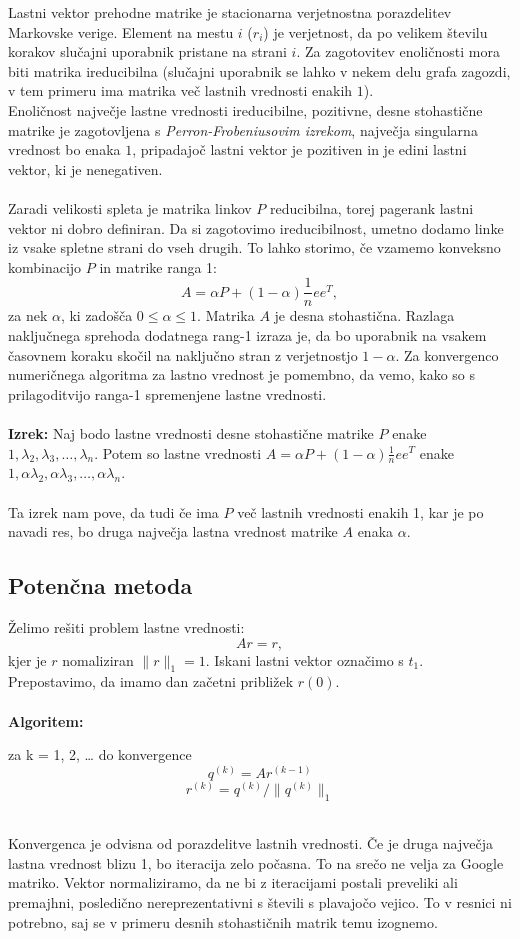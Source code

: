 \documentclass[12pt,a4paper]{amsart}
\begin{document}
Lastni vektor prehodne matrike je stacionarna verjetnostna porazdelitev Markovske verige. Element na mestu $i$ ($r_i$) je verjetnost, da po velikem številu korakov slučajni uporabnik pristane na strani $i$. Za zagotovitev enoličnosti mora biti matrika ireducibilna (slučajni uporabnik se lahko v nekem delu grafa zagozdi, v tem primeru ima matrika več lastnih vrednosti enakih $1$). \\ Enoličnost največje lastne vrednosti ireducibilne, pozitivne, desne stohastične matrike je zagotovljena s \textit{Perron-Frobeniusovim izrekom}, največja singularna vrednost bo enaka $1$, pripadajoč lastni vektor je pozitiven in je edini lastni vektor, ki je nenegativen. \\
\\Zaradi velikosti spleta je matrika linkov $P$ reducibilna, torej pagerank lastni vektor ni dobro definiran. Da si zagotovimo ireducibilnost, umetno dodamo linke iz vsake spletne strani do vseh drugih. To lahko storimo, če vzamemo konveksno kombinacijo $P$ in matrike ranga 1:
$$A=\alpha P + (1-\alpha)\frac{1}{n}ee^T,$$
za nek $\alpha$, ki zadošča $0 \leq \alpha \leq 1$. Matrika $A$ je desna stohastična. Razlaga naključnega sprehoda dodatnega rang-1 izraza je, da bo uporabnik na vsakem časovnem koraku skočil na naključno stran z verjetnostjo $1- \alpha$.
Za konvergenco numeričnega algoritma za lastno vrednost je pomembno, da vemo, kako so s prilagoditvijo ranga-1 spremenjene lastne vrednosti.\\
\\ \textbf{Izrek:} Naj bodo lastne vrednosti desne stohastične matrike $P$ enake ${1, \lambda_2, \lambda_3, … , \lambda_n}$. Potem so lastne vrednosti $A=\alpha P + (1- \alpha) \frac{1}{n}ee^T$ enake ${1, \alpha \lambda_2, \alpha \lambda_3, … , \alpha \lambda_n}$.\\
\\
Ta izrek nam pove, da tudi če ima $P$ več lastnih vrednosti enakih 1, kar je po navadi res, bo druga največja lastna vrednost matrike $A$ enaka $\alpha$. 

\subsection{Potenčna metoda}
Želimo rešiti problem lastne vrednosti:
$$Ar = r,$$
kjer je $r$ nomaliziran $\|r\|_1=1$. Iskani lastni vektor označimo s $t_1$. Prepostavimo, da imamo dan začetni približek $r{(0)}$. \\
\\
\textbf{Algoritem:} \\
\begin{center} za k = 1, 2, … do konvergence
	$$q^{(k)} = Ar^{(k-1)}$$ 
	$$r^{(k)} = q^{(k)}/ \|q^{(k)}\|_1$$ \\
\end{center}
Konvergenca je odvisna od porazdelitve lastnih vrednosti. Če je druga največja lastna vrednost blizu 1, bo iteracija zelo počasna. To na srečo ne velja za Google matriko. Vektor normaliziramo, da ne bi z iteracijami postali preveliki ali premajhni, posledično nereprezentativni s števili s plavajočo vejico. To v resnici ni potrebno, saj se v primeru desnih stohastičnih matrik temu izognemo.
\end{document}
